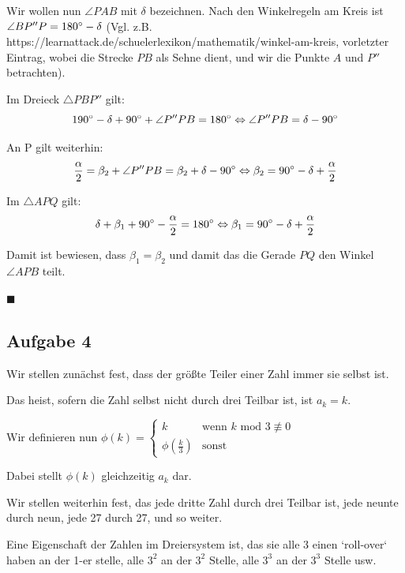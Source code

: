 \documentclass[11pt]{article}
\begin{document}
    Wir wollen nun $\angle PAB$ mit $\delta$ bezeichnen.
    Nach den Winkelregeln am Kreis ist $\angle BP''P = 180 \degree - \delta$
    (Vgl. z.B. https://learnattack.de/schuelerlexikon/mathematik/winkel-am-kreis, vorletzter Eintrag, wobei
    die Strecke $PB$ als Sehne dient, und wir die Punkte $A$ und $P''$ betrachten).

    \newpage

    Im Dreieck $\triangle PBP''$ gilt:
    \[190 \degree - \delta + 90 \degree + \angle P''PB = 180 \degree \Leftrightarrow \angle P''PB = \delta - 90 \degree\]

    An P gilt weiterhin:
    \[\frac{\alpha}{2} = \beta_2 + \angle P''PB = \beta_2 + \delta - 90 \degree \Leftrightarrow \beta_2 = 90 \degree - \delta + \frac{\alpha}{2}\]


    Im $\triangle APQ$ gilt:
    \[\delta + \beta_1 + 90 \degree - \frac{\alpha}{2} = 180 \degree \Leftrightarrow \beta_1 = 90 \degree - \delta + \frac{\alpha}{2}\]

    Damit ist bewiesen, dass $\beta_1 = \beta_2$ und damit das die Gerade $PQ$ den Winkel $\angle APB$ teilt.

    $\blacksquare$

    \newpage

    \subsection*{Aufgabe 4}

    Wir stellen zunächst fest, dass der größte Teiler einer Zahl immer sie selbst ist.

    Das heist, sofern die Zahl selbst nicht durch drei Teilbar ist, ist $a_k = k$.

    Wir definieren nun $\phi(k) = \begin{cases}k & \text{wenn } k\text{ mod }3 \not \equiv 0 \\\phi(\frac{k}{3}) & \text{sonst}\end{cases}$

    Dabei stellt $\phi(k)$ gleichzeitig $a_k$ dar.

    \bigskip

    Wir stellen weiterhin fest, das jede dritte Zahl durch drei Teilbar ist, jede neunte durch neun,
    jede 27 durch 27, und so weiter.

    \bigskip

    Eine Eigenschaft der Zahlen im Dreiersystem ist, das sie alle 3 einen `roll-over` haben an der
    1-er stelle, alle $3^2$ an der $3^2$ Stelle, alle $3^3$ an der $3^3$ Stelle usw.
\end{document}

